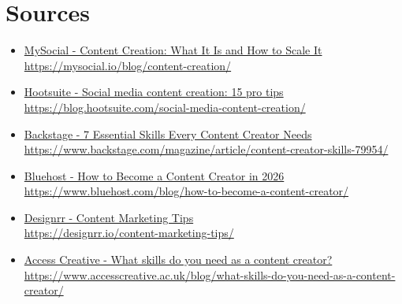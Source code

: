 \documentclass[11pt]{article}
\begin{document}
\section*{Sources}
\begin{itemize}[label={},leftmargin=0.9em,itemsep=1pt]
\footnotesize
\item \href{https://mysocial.io/blog/content-creation/}{MySocial - Content Creation: What It Is and How to Scale It} \\ {\color{softgray}\url{https://mysocial.io/blog/content-creation/}}
\item \href{https://blog.hootsuite.com/social-media-content-creation/}{Hootsuite - Social media content creation: 15 pro tips} \\ {\color{softgray}\url{https://blog.hootsuite.com/social-media-content-creation/}}
\item \href{https://www.backstage.com/magazine/article/content-creator-skills-79954/}{Backstage - 7 Essential Skills Every Content Creator Needs} \\ {\color{softgray}\url{https://www.backstage.com/magazine/article/content-creator-skills-79954/}}
\item \href{https://www.bluehost.com/blog/how-to-become-a-content-creator/}{Bluehost - How to Become a Content Creator in 2026} \\ {\color{softgray}\url{https://www.bluehost.com/blog/how-to-become-a-content-creator/}}
\item \href{https://designrr.io/content-marketing-tips/}{Designrr - Content Marketing Tips} \\ {\color{softgray}\url{https://designrr.io/content-marketing-tips/}}
\item \href{https://www.accesscreative.ac.uk/blog/what-skills-do-you-need-as-a-content-creator/}{Access Creative - What skills do you need as a content creator?} \\ {\color{softgray}\url{https://www.accesscreative.ac.uk/blog/what-skills-do-you-need-as-a-content-creator/}}
\end{itemize}
\normalsize
\end{document}
